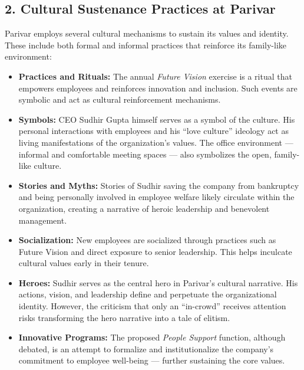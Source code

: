 \documentclass[10pt,a4paper]{book}
\begin{document}
\subsection*{2. Cultural Sustenance Practices at Parivar}

Parivar employs several cultural mechanisms to sustain its values and identity. These include both formal and informal practices that reinforce its family-like environment:

\begin{itemize}
    \item \textbf{Practices and Rituals:} The annual \textit{Future Vision} exercise is a ritual that empowers employees and reinforces innovation and inclusion. Such events are symbolic and act as cultural reinforcement mechanisms.

    \item \textbf{Symbols:} CEO Sudhir Gupta himself serves as a symbol of the culture. His personal interactions with employees and his “love culture” ideology act as living manifestations of the organization’s values. The office environment — informal and comfortable meeting spaces — also symbolizes the open, family-like culture.

    \item \textbf{Stories and Myths:} Stories of Sudhir saving the company from bankruptcy and being personally involved in employee welfare likely circulate within the organization, creating a narrative of heroic leadership and benevolent management.

    \item \textbf{Socialization:} New employees are socialized through practices such as Future Vision and direct exposure to senior leadership. This helps inculcate cultural values early in their tenure.

    \item \textbf{Heroes:} Sudhir serves as the central hero in Parivar’s cultural narrative. His actions, vision, and leadership define and perpetuate the organizational identity. However, the criticism that only an “in-crowd” receives attention risks transforming the hero narrative into a tale of elitism.

    \item \textbf{Innovative Programs:} The proposed \textit{People Support} function, although debated, is an attempt to formalize and institutionalize the company’s commitment to employee well-being — further sustaining the core values.
\end{itemize}
\end{document}
